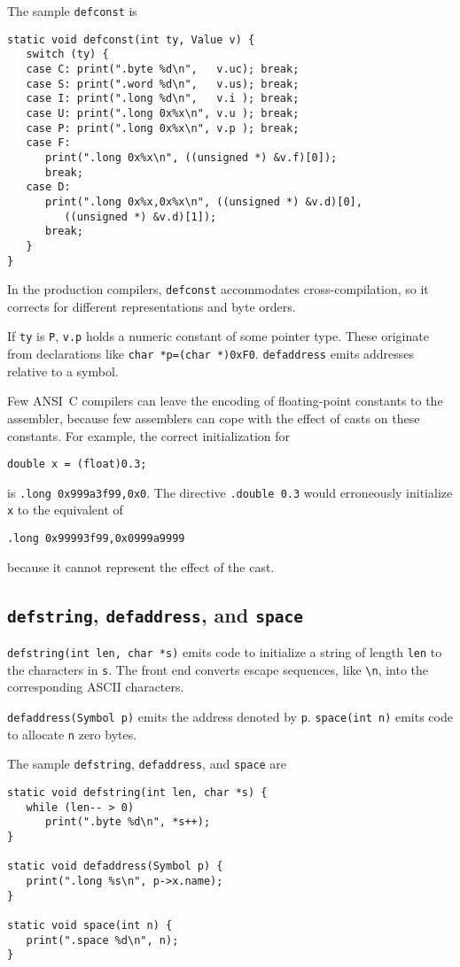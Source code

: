 The sample \verb|defconst| is
\begin{verbatim}
static void defconst(int ty, Value v) {
   switch (ty) {
   case C: print(".byte %d\n",   v.uc); break;
   case S: print(".word %d\n",   v.us); break;
   case I: print(".long %d\n",   v.i ); break;
   case U: print(".long 0x%x\n", v.u ); break;
   case P: print(".long 0x%x\n", v.p ); break;
   case F:
      print(".long 0x%x\n", ((unsigned *) &v.f)[0]);
      break;
   case D: 
      print(".long 0x%x,0x%x\n", ((unsigned *) &v.d)[0],
         ((unsigned *) &v.d)[1]);
      break;
   }
}
\end{verbatim}
In the production compilers, \verb|defconst| accommodates cross-compilation,
so it corrects for different representations and byte orders.

If \verb|ty| is \verb|P|, \verb|v.p| holds a numeric constant of some pointer type.
These originate from declarations like \verb|char *p=(char *)0xF0|.
\verb|defaddress| emits addresses relative to a symbol.

Few ANSI~C compilers can leave the encoding of floating-point constants
to the assembler, because few assemblers can cope with the effect of
casts on these constants.  For example, the correct initialization for
\begin{verbatim}
double x = (float)0.3;
\end{verbatim}
is \verb|.long 0x999a3f99,0x0|.
The directive \verb|.double 0.3| would erroneously initialize \verb|x|
to the equivalent of
\begin{verbatim}
.long 0x99993f99,0x0999a9999
\end{verbatim}
because it cannot represent the effect of the cast.


\subsection{{\tt defstring}, {\tt defaddress}, and \tt space}

\label{defstring}
\label{defaddress}
\label{space}

\verb|defstring(int len, char *s)| emits code to initialize
a string of length \verb|len| to the characters in \verb|s|.
The front end converts escape sequences, like \verb|\n|, into
the corresponding ASCII characters.

\verb|defaddress(Symbol p)| emits the address denoted by \verb|p|.
\verb|space(int n)| emits code to allocate \verb|n| zero bytes.

The sample \verb|defstring|, \verb|defaddress|, and \verb|space| are
\begin{verbatim}
static void defstring(int len, char *s) {
   while (len-- > 0)
      print(".byte %d\n", *s++);
}

static void defaddress(Symbol p) {
   print(".long %s\n", p->x.name);
}

static void space(int n) {
   print(".space %d\n", n);
}
\end{verbatim}


